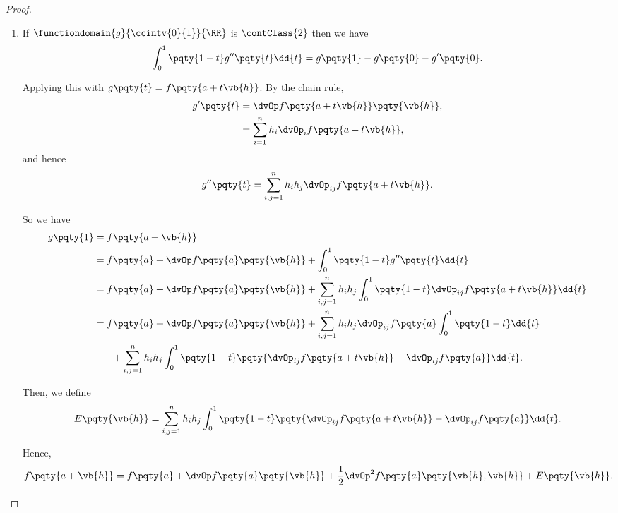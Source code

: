 \begin{proof}
    \begin{enumerate}[label=(\alph*)]
        \item If \(\functiondomain{g}{\ccintv{0}{1}}{\RR}\) is \(\contClass{2}\) then we have
        \[
            \int_{0}^{1} \pqty{1 - t} g''\pqty{t} \dd{t} = g\pqty{1} - g\pqty{0} - g'\pqty{0}.
        \]

        Applying this with \(g\pqty{t} = f\pqty{a + t \vb{h}}\). By the chain rule,
        \begin{align*}
            g'\pqty{t} &= \dvOp f\pqty{a + t \vb{h}} \pqty{\vb{h}}, \\
            &= \sum_{i = 1}^{n} h_i \dvOp_i f\pqty{a + t \vb{h}},
        \end{align*}
        and hence
        \[
            g''\pqty{t} = \sum_{i, j = 1}^{n} h_i h_j \dvOp_{ij} f\pqty{a + t \vb{h}}.
        \]

        So we have
        \begin{align*}
            g\pqty{1} &= f\pqty{a + \vb{h}} \\
            &= f\pqty{a} + \dvOp f\pqty{a} \pqty{\vb{h}} + \int_{0}^{1} \pqty{1 - t} g''\pqty{t} \dd{t} \\
            &= f\pqty{a} + \dvOp f\pqty{a} \pqty{\vb{h}} + \sum_{i, j = 1}^{n} h_i h_j \int_{0}^{1} \pqty{1 - t} \dvOp_{ij} f\pqty{a + t \vb{h}} \dd{t} \\
            &= f\pqty{a} + \dvOp f\pqty{a} \pqty{\vb{h}} + \sum_{i, j = 1}^{n} h_i h_j \dvOp_{ij} f\pqty{a} \int_{0}^{1} \pqty{1 - t} \dd{t} \\
            &\phantom{=} \quad + \sum_{i, j = 1}^{n} h_i h_j \int_{0}^{1} \pqty{1 - t} \pqty{\dvOp_{ij} f\pqty{a + t \vb{h}} - \dvOp_{ij} f\pqty{a}} \dd{t}.
        \end{align*}

        Then, we define
        \[
            E\pqty{\vb{h}} = \sum_{i, j = 1}^{n} h_i h_j \int_{0}^{1} \pqty{1 - t} \pqty{\dvOp_{ij} f\pqty{a + t \vb{h}} - \dvOp_{ij} f\pqty{a}} \dd{t}.
        \]

        Hence,
        \[
            f\pqty{a + \vb{h}} = f\pqty{a} + \dvOp f\pqty{a} \pqty{\vb{h}} + \frac{1}{2} \dvOp^2 f\pqty{a}\pqty{\vb{h}, \vb{h}} + E\pqty{\vb{h}}.
        \]


\end{enumerate}
\end{proof}
